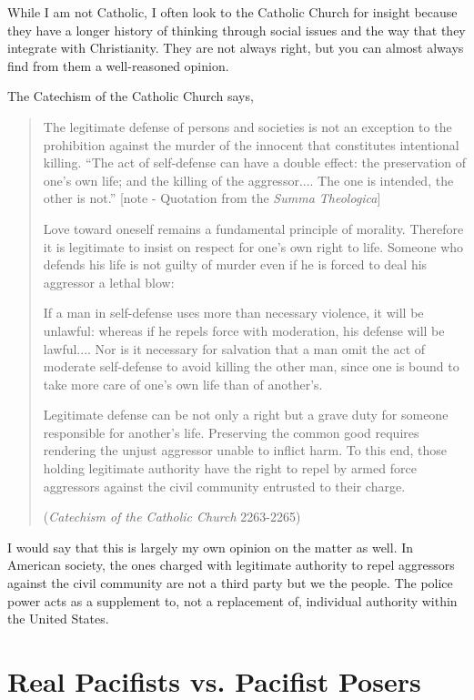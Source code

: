 While I am not Catholic, I often look to the Catholic Church for insight
because they have a longer history of thinking through social issues
and the way that they integrate with Christianity. They are not always
right, but you can almost always find from them a well-reasoned
opinion.

The Catechism of the Catholic Church says, 

\begin{quote}
The legitimate defense of persons and societies is not an exception to
the prohibition against the murder of the innocent that constitutes
intentional killing. ``The act of self-defense can have a
double effect: the preservation of one's own life; and
the killing of the aggressor.... The one is intended, the other is
not.'' [note - Quotation from the \textit{Summa
Theologica}]

Love toward oneself remains a fundamental principle of morality.
Therefore it is legitimate to insist on respect for
one's own right to life. Someone who defends his life
is not guilty of murder even if he is forced to deal his aggressor a
lethal blow: 

If a man in self-defense uses more than necessary violence, it will be
unlawful: whereas if he repels force with moderation, his defense will
be lawful.... Nor is it necessary for salvation that a man omit the act
of moderate self-defense to avoid killing the other man, since one is
bound to take more care of one's own life than of
another's.

Legitimate defense can be not only a right but a grave duty for someone
responsible for another's life. Preserving the common
good requires rendering the unjust aggressor unable to inflict harm. To
this end, those holding legitimate authority have the right to repel by
armed force aggressors against the civil community entrusted to their
charge.

(\textit{Catechism of the Catholic Church} 2263-2265) 
\end{quote}

I would say that this is largely my own opinion on the matter as well.
In American society, the ones charged with legitimate authority to
repel aggressors against the civil community
are not a third party
but we the people. The police power acts as a supplement to, not a
replacement of, individual authority within the United States.

\section{Real Pacifists vs. Pacifist Posers}

